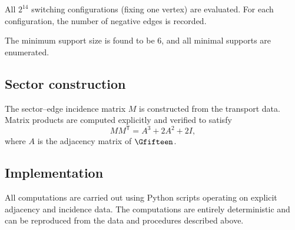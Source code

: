 All $2^{14}$ switching configurations (fixing one vertex) are evaluated.
For each configuration, the number of negative edges is recorded.

The minimum support size is found to be $6$, and all minimal supports
are enumerated.

\subsection{Sector construction}

The sector--edge incidence matrix $M$ is constructed from the transport
data. Matrix products are computed explicitly and verified to satisfy
\[
MM^{\mathsf T} = A^3 + 2A^2 + 2I,
\]
where $A$ is the adjacency matrix of $\Gfifteen$.

\subsection{Implementation}

All computations are carried out using Python scripts operating on
explicit adjacency and incidence data. The computations are entirely
deterministic and can be reproduced from the data and procedures
described above.
